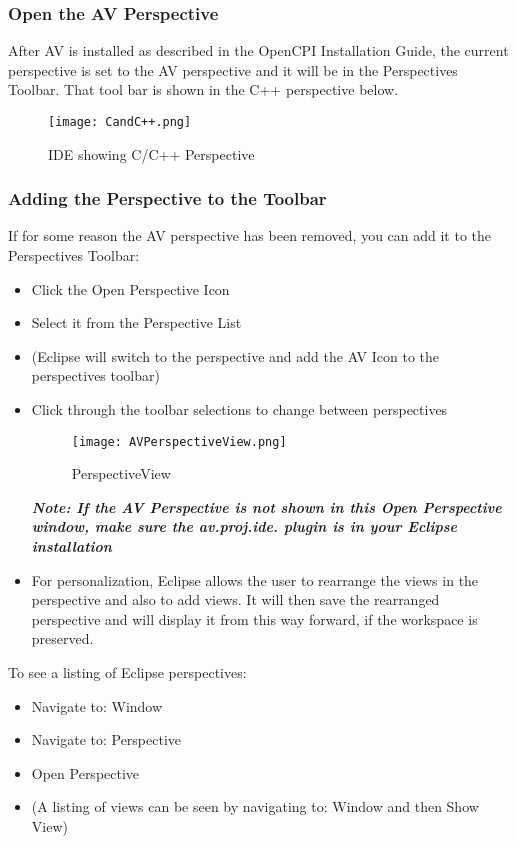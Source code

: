 \documentclass[10pt, a4paper, oneside]{article}
\begin{document}
\subsubsection{Open the AV Perspective}
 After AV is installed as described in the OpenCPI Installation Guide, the current perspective is set to the AV perspective and it will be in the Perspectives Toolbar.  That tool bar is shown in the C++ perspective below. \\

\begin{figure}[h!]
\centering
\caption{IDE showing C/C++ Perspective}\label{fig:IDE_CandC++Perspective}
	\texttt{[image: CandC++.png]}
\end{figure}
\subsubsection{Adding the Perspective to the Toolbar}
If for some reason the AV perspective has been removed, you can add it to the Perspectives Toolbar:
\begin{itemize}
\item Click the Open Perspective Icon
\item Select it from the Perspective List
\item[](Eclipse will switch to the perspective and add the AV Icon to the perspectives toolbar)
\item Click through the toolbar selections to change between perspectives\\
\begin{figure}[h!]
  \centering
  \caption{PerspectiveView}\label{fig:Perspective View}
    \texttt{[image: AVPerspectiveView.png]}
\end{figure}


\textbf{\emph{Note: If the AV Perspective is not shown in this Open Perspective window, make sure the \textbf{av.proj.ide. plugin} is in your Eclipse installation}}
\item[]For personalization, Eclipse allows the user to rearrange the views in the perspective and also to add views. It will then save the rearranged perspective and will display it from this way forward, if the workspace is preserved.
\end{itemize}
To see a listing of Eclipse perspectives:
\begin{itemize}
\item Navigate to: Window
\item Navigate to: Perspective
\item Open Perspective
\item[] (A listing of views can be seen by navigating to: Window and then Show View)
\end{itemize}
\end{document}
